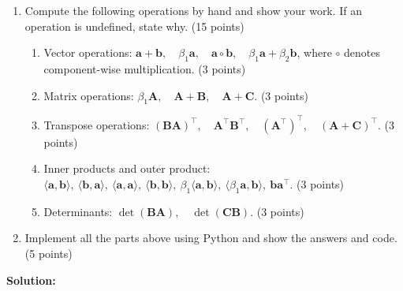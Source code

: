 \documentclass[11pt]{article}
\begin{document}
\begin{enumerate}
    \item[(a)] Compute the following operations by hand and show your work. If an operation is undefined, state why. (15 points)
    \begin{enumerate}
        \item[(i)] Vector operations: $\mathbf{a} + \mathbf{b}, \quad \beta_1 \mathbf{a}, \quad \mathbf{a} \circ \mathbf{b}, \quad \beta_1 \mathbf{a} + \beta_2 \mathbf{b}$, where $\circ$ denotes component-wise multiplication. (3 points)
        \item[(ii)] Matrix operations: $\beta_1 \mathbf{A}, \quad \mathbf{A} + \mathbf{B}, \quad \mathbf{A} + \mathbf{C}$. (3 points)
        \item[(iii)] Transpose operations: $(\mathbf{BA})^\top, \quad \mathbf{A}^\top \mathbf{B}^\top, \quad (\mathbf{A}^{\top})^{\top}, \quad (\mathbf{A} + \mathbf{C})^\top$. (3 points)
        \item[(iv)] Inner products and outer product: $\langle \mathbf{a}, \mathbf{b} \rangle, \ \langle \mathbf{b}, \mathbf{a} \rangle, \ \langle \mathbf{a}, \mathbf{a} \rangle, \ \langle \mathbf{b}, \mathbf{b} \rangle, \ \beta_1 \langle \mathbf{a}, \mathbf{b} \rangle, \ \langle \beta_1 \mathbf{a}, \mathbf{b} \rangle, \ \mathbf{b} \mathbf{a}^\top$. (3 points)
        \item[(v)] Determinants: $\det(\mathbf{BA}), \quad \det(\mathbf{CB})$. (3 points)
    \end{enumerate}
    \item[(b)] Implement all the parts above using Python and show the answers and code. (5 points)
\end{enumerate}

\textbf{Solution:}
\end{document}
